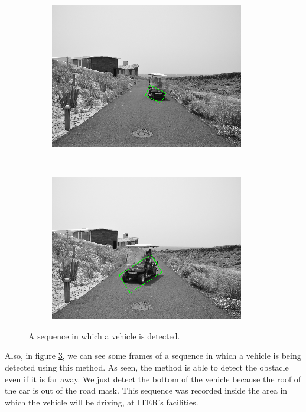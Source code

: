 \begin{figure}[h!]
\begin{subfigure}[b]{0.24\columnwidth}
	    \includegraphics[width=\textwidth]{sequence/seq7}\label{fig:seq7}
        \end{subfigure}%
        ~
        \begin{subfigure}[b]{0.24\columnwidth}
	    \includegraphics[width=\textwidth]{sequence/seq8}\label{fig:seq8}
        \end{subfigure}%
        \caption{A sequence in which a vehicle is detected.}\label{fig:cp01_sequence_example}
\end{figure}

Also, in figure \ref{fig:cp01_sequence_example}, we can see some frames of a sequence in which a vehicle is being detected using this method. As seen, the method is able to detect the obstacle even if it is far away. We just detect the bottom of the vehicle because the roof of the car is out of the road mask. This sequence was recorded inside the area in which the vehicle will be driving, at ITER's facilities.

